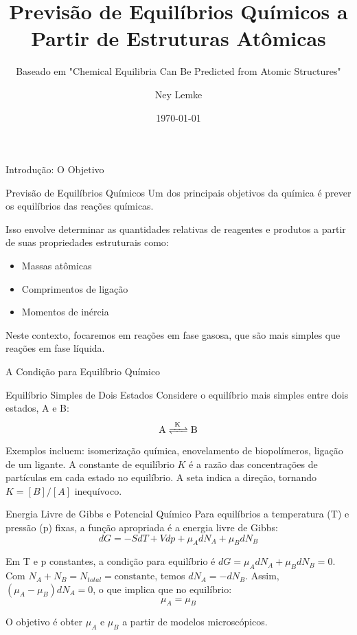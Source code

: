 \documentclass{beamer}
\title{Previsão de Equilíbrios Químicos a Partir de Estruturas Atômicas}
\subtitle{Baseado em "Chemical Equilibria Can Be Predicted from Atomic Structures"}
\author{Ney Lemke}
\date{\today}
\begin{document}
\frame{\titlepage}

\begin{frame}{Introdução: O Objetivo}
    \begin{block}{Previsão de Equilíbrios Químicos}
        Um dos principais objetivos da química é prever os equilíbrios das reações químicas. 
        
        Isso envolve determinar as quantidades relativas de reagentes e produtos a partir de suas propriedades estruturais como:
        \begin{itemize}
            \item Massas atômicas 
            \item Comprimentos de ligação 
            \item Momentos de inércia 
        \end{itemize}
        
        Neste contexto, focaremos em reações em fase gasosa, que são mais simples que reações em fase líquida. 
    \end{block}
\end{frame}

\begin{frame}{A Condição para Equilíbrio Químico}
    \begin{block}{Equilíbrio Simples de Dois Estados}
        Considere o equilíbrio mais simples entre dois estados, A e B:
        $$ \ce{A <=>[\text{K}] B} $$
        
        Exemplos incluem: isomerização química, enovelamento de biopolímeros, ligação de um ligante.
        A constante de equilíbrio $K$ é a razão das concentrações de partículas em cada estado no equilíbrio. 
        A seta indica a direção, tornando $K = [B]/[A]$ inequívoco. 
    \end{block}
    
    \begin{block}{Energia Livre de Gibbs e Potencial Químico}
        Para equilíbrios a temperatura (T) e pressão (p) fixas, a função apropriada é a energia livre de Gibbs:
        $$ dG = -SdT + Vdp + \mu_A dN_A + \mu_B dN_B $$
        
        
        Em T e p constantes, a condição para equilíbrio é $dG = \mu_A dN_A + \mu_B dN_B = 0$.  
        Com $N_A + N_B = N_{total} = \text{constante}$, temos $dN_A = -dN_B$.  
        Assim, $(\mu_A - \mu_B)dN_A = 0$, o que implica que no equilíbrio:
        $$ \mu_A = \mu_B $$
        
        O objetivo é obter $\mu_A$ e $\mu_B$ a partir de modelos microscópicos. 
    \end{block}
\end{frame}
\end{document}
